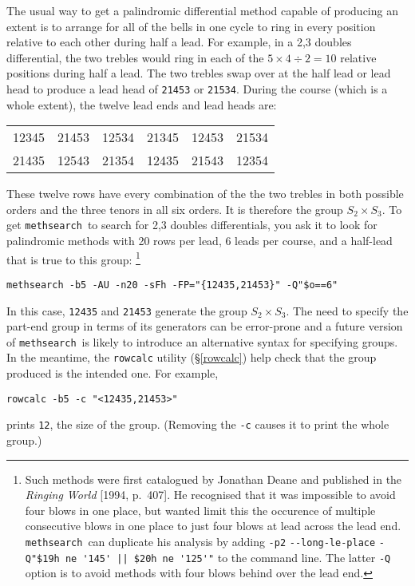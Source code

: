 \documentclass[a4paper,11pt,oneside]{book}
\makeatletter
\newcommand{\ttcmdidx}[1]{\texttt{#1}\index{#1@{\texttt{#1}}}}
\def\methsearch{\texttt{meth\-search}}
\newcommand{\sref}[1]{\hyperref[#1]{\S\ref{#1}}}
\makeatother
\begin{document}
The usual way to get a palindromic differential method capable of producing 
an extent is to arrange for all of the bells in one cycle to ring in every 
position relative to each other during half a lead.  For example, in a 
2,3 doubles differential, the two trebles would ring in each of the 
$\textrm{5}\times\textrm{4}\div\textrm{2} = \textrm{10}$ relative positions 
during half a lead.  The two trebles swap over at the half lead or lead head
to produce a lead head of \verb+21453+ or \verb+21534+.  During the course
(which is a whole extent), the twelve lead ends and lead heads are:
\begin{center}
\begin{tabular}{cccccc}
12345&21453&12534&21345&12453&21534\\
21435&12543&21354&12435&21543&12354\\
\end{tabular}
\end{center}
These twelve rows have every combination of the the two trebles in both 
possible orders and the three tenors in all six orders.  It is therefore
the group $S_2 \times S_3$.  
To get \methsearch\ to search for 2,3 doubles differentials, you ask
it to look for palindromic methods with 20 rows per lead, 6 leads per course, 
and a half-lead that is true to this group:%
\footnote{Such methods were first catalogued by Jonathan 
Deane and published in the \textit{Ringing World}
[1994, p.~407].  He recognised that it was impossible to avoid four blows
in one place, but wanted limit this the occurence of multiple consecutive 
blows in one place to just four blows at lead across the lead end.  
\methsearch\ can duplicate his analysis by adding \verb+-p2+ 
\verb+--long-le-place+ \verb+-Q"$19h ne '145' || $20h ne '125'"+ 
to the command line.  The latter \verb+-Q+
option is to avoid methods with four blows behind over the lead end.}%
\begin{Verbatim}
methsearch -b5 -AU -n20 -sFh -FP="{12435,21453}" -Q"$o==6"
\end{Verbatim}
In this case, \verb+12435+ and \verb+21453+ generate the group 
$S_2 \times S_3$.   The need to specify the part-end group in terms
of its generators can be error-prone 
and a future version of \methsearch\ is likely to introduce an alternative 
syntax for specifying groups.  
In the meantime, the \ttcmdidx{rowcalc} utility (\sref{rowcalc})
help check that the group produced is the intended one.  For example,
\begin{Verbatim}
rowcalc -b5 -c "<12435,21453>"
\end{Verbatim}
prints \verb+12+, the size of the group.  (Removing the \verb+-c+ causes it
to print the whole group.)
\end{document}
